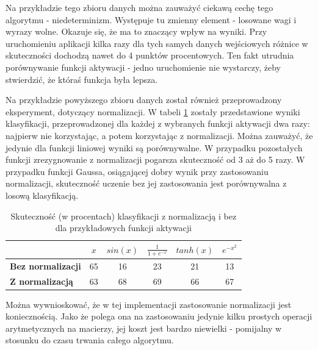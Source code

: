 \documentclass{article}
\begin{document}
Na przykładzie tego zbioru danych można zauważyć ciekawą cechę tego algorytmu - niedeterminizm.
Występuje tu zmienny element - losowane wagi i wyrazy wolne.
Okazuje się, że ma to znaczący wpływ na wyniki.
Przy uruchomieniu aplikacji kilka razy dla tych samych danych wejściowych różnice w skuteczności dochodzą nawet do 4 punktów procentowych.
Ten fakt utrudnia porównywanie funkcji aktywacji - jedno uruchomienie nie wystarczy, żeby stwierdzić, że któraś funkcja była lepsza.

Na przykładzie powyższego zbioru danych został również przeprowadzony eksperyment, dotyczący normalizacji.
W tabeli \ref{tab_norm} zostały przedstawione wyniki klasyfikacji, przeprowadzonej dla każdej z wybranych funkcji aktywacji dwa razy: najpierw nie korzystając, a potem korzystając z normalizacji.
Można zauważyć, że jedynie dla funkcji liniowej wyniki są porównywalne.
W przypadku pozostałych funkcji zrezygnowanie z normalizacji pogarsza skuteczność od 3 aż do 5 razy.
W przypadku funkcji Gaussa, osiągającej dobry wynik przy zastosowaniu normalizacji, skuteczność uczenie bez jej zastosowania jest porównywalna z losową klasyfikacją.
\begin{table}[H]
\caption{Skuteczność (w procentach) klasyfikacji z normalizacją i bez dla przykładowych funkcji aktywacji}
\label{tab_norm}
\begin{tabular}{|l|c|c|c|c|c|}
\hline
& $x$ & $sin(x)$ & $\frac{1}{1+e^{-x}}$ & $tanh(x)$ & $e^{-x^2}$ \\
\hline
\textbf{Bez normalizacji} & 65 & 16 & 23 & 21 & 13 \\
\hline
\textbf{Z normalizacją} & 63 & 68 & 69 & 66 & 67 \\
\hline

\hline
\end{tabular}
\end{table}
Można wywnioskować, że w tej implementacji zastosowanie normalizacji jest koniecznością.
Jako że polega ona na zastosowaniu jedynie kilku prostych operacji arytmetycznych na macierzy, jej koszt jest bardzo niewielki - pomijalny w stosunku do czasu trwania całego algorytmu.
\end{document}
